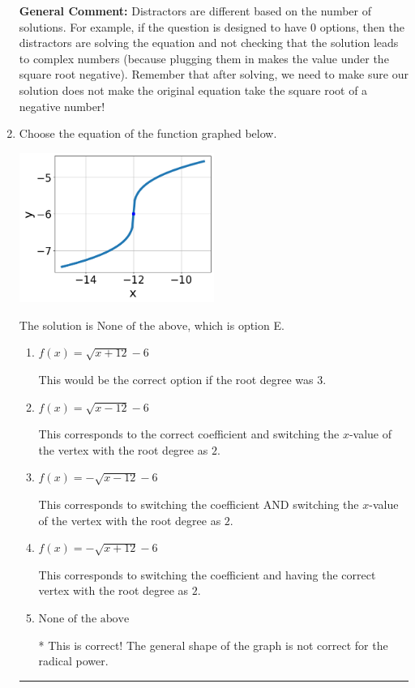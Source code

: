 \documentclass{extbook}[14pt]
\newcommand{\litem}[1]{\item #1

\rule{\textwidth}{0.4pt}}
\begin{document}
\begin{enumerate}
{\textbf{General Comment:} Distractors are different based on the number of solutions. For example, if the question is designed to have 0 options, then the distractors are solving the equation and not checking that the solution leads to complex numbers (because plugging them in makes the value under the square root negative). Remember that after solving, we need to make sure our solution does not make the original equation take the square root of a negative number!
}
\litem{
Choose the equation of the function graphed below.

\begin{center}
    \includegraphics[width=0.5\textwidth]{../Figures/radicalGraphToEquationB.png}
\end{center}


The solution is \( \text{None of the above} \), which is option E.\begin{enumerate}[label=\Alph*.]
\item \( f(x) = \sqrt{x + 12} - 6 \)

This would be the correct option if the root degree was $3$.
\item \( f(x) = \sqrt{x - 12} - 6 \)

This corresponds to the correct coefficient and switching the $x$-value of the vertex with the root degree as $2$.
\item \( f(x) = - \sqrt{x - 12} - 6 \)

This corresponds to switching the coefficient AND switching the $x$-value of the vertex with the root degree as $2$.
\item \( f(x) = - \sqrt{x + 12} - 6 \)

This corresponds to switching the coefficient and having the correct vertex with the root degree as $2$.
\item \( \text{None of the above} \)

* This is correct! The general shape of the graph is not correct for the radical power.
\end{enumerate}

}
\end{enumerate}
\end{document}
